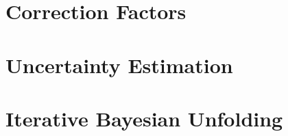 \section{Correction Factors}
    

\section{Uncertainty Estimation}\label{sec:uncertainty_analysis}

\section{Iterative Bayesian Unfolding}
    




